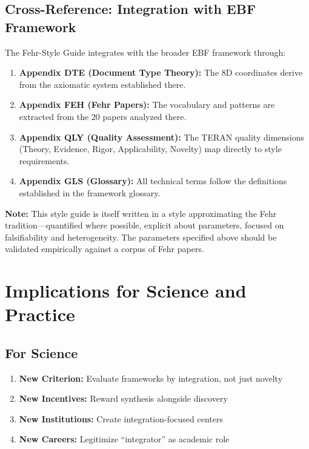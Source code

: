 \subsection{Cross-Reference: Integration with EBF Framework}

The Fehr-Style Guide integrates with the broader EBF framework through:

\begin{enumerate}
\item \textbf{Appendix DTE (Document Type Theory):} The 8D coordinates
      derive from the axiomatic system established there.

\item \textbf{Appendix FEH (Fehr Papers):} The vocabulary and patterns
      are extracted from the 20 papers analyzed there.

\item \textbf{Appendix QLY (Quality Assessment):} The TERAN quality
      dimensions (Theory, Evidence, Rigor, Applicability, Novelty)
      map directly to style requirements.

\item \textbf{Appendix GLS (Glossary):} All technical terms follow the
      definitions established in the framework glossary.
\end{enumerate}

\textbf{Note:} This style guide is itself written in a style approximating
the Fehr tradition---quantified where possible, explicit about parameters,
focused on falsifiability and heterogeneity. The parameters specified above
should be validated empirically against a corpus of Fehr papers.



\section{Implications for Science and Practice}
\label{sec:meta-implications}

\subsection{For Science}

\begin{enumerate}
\item \textbf{New Criterion:} Evaluate frameworks by integration, not just novelty
\item \textbf{New Incentives:} Reward synthesis alongside discovery
\item \textbf{New Institutions:} Create integration-focused centers
\item \textbf{New Careers:} Legitimize ``integrator'' as academic role
\end{enumerate}

